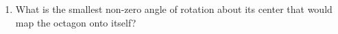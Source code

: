 \begin{enumerate}
\item What is the smallest non-zero angle of rotation about its center that would map the octagon onto itself?
\begin{center}
  \end{center}




\end{enumerate}
